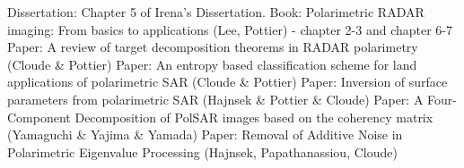 \begin{thebibliography}{123}
 Dissertation: Chapter 5 of Irena's Dissertation. 
 Book: Polarimetric RADAR imaging: From basics to applications (Lee, Pottier) - chapter 2-3 and chapter 6-7 
 Paper: A review of target decomposition theorems in RADAR polarimetry (Cloude \& Pottier) 
 Paper: An entropy based classification scheme for land applications of polarimetric SAR (Cloude \& Pottier) 
 Paper: Inversion of surface parameters from polarimetric SAR (Hajnsek \& Pottier \& Cloude) 
 Paper: A Four-Component Decomposition of PolSAR images based on the coherency matrix (Yamaguchi \& Yajima \& Yamada) 
 Paper: Removal of Additive Noise in Polarimetric Eigenvalue Processing (Hajnsek, Papathanassiou, Cloude)
\end{thebibliography}
